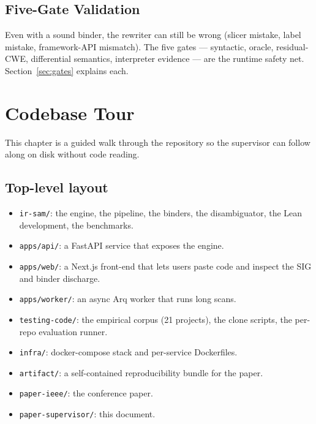 \documentclass[a4paper,11pt]{report}
\begin{document}
\section{Five-Gate Validation}
Even with a sound binder, the rewriter can still be wrong (slicer mistake, label mistake, framework-API mismatch). The five gates --- syntactic, oracle, residual-CWE, differential semantics, interpreter evidence --- are the runtime safety net. Section~\ref{sec:gates} explains each.

\chapter{Codebase Tour}\label{ch:tour}
This chapter is a guided walk through the repository so the supervisor can follow along on disk without code reading.

\section{Top-level layout}
\begin{itemize}
\item \texttt{ir-sam/}: the engine, the pipeline, the binders, the disambiguator, the Lean development, the benchmarks.
\item \texttt{apps/api/}: a FastAPI service that exposes the engine.
\item \texttt{apps/web/}: a Next.js front-end that lets users paste code and inspect the SIG and binder discharge.
\item \texttt{apps/worker/}: an async Arq worker that runs long scans.
\item \texttt{testing-code/}: the empirical corpus (21 projects), the clone scripts, the per-repo evaluation runner.
\item \texttt{infra/}: docker-compose stack and per-service Dockerfiles.
\item \texttt{artifact/}: a self-contained reproducibility bundle for the paper.
\item \texttt{paper-ieee/}: the conference paper.
\item \texttt{paper-supervisor/}: this document.
\end{itemize}
\end{document}
